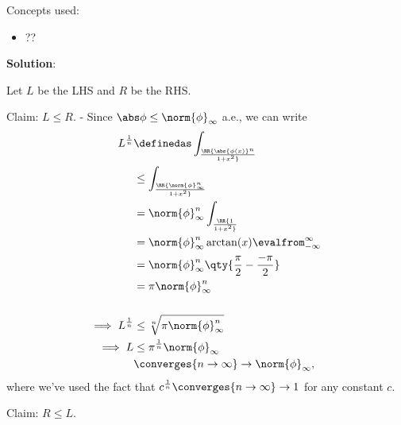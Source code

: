 \begin{solution}

Concepts used:

\begin{itemize}
\tightlist
\item
  ??
\end{itemize}

\textbf{Solution}:

Let \(L\) be the LHS and \(R\) be the RHS.

Claim: \(L\leq R\). - Since \(\abs \phi \leq \norm{\phi}_\infty\) a.e.,
we can write
\begin{align*}  
  L^{1\over n} 
  &\definedas \int_\RR { \abs{\phi(x)}^n \over 1+ x^2} \\
  &\leq \int_\RR { \norm{\phi}_\infty^n \over 1+ x^2}  \\
  &= \norm{\phi}_\infty^n \int_\RR {1\over 1 + x^2} \\
  &= \norm{\phi}_\infty^n \arctan(x)\evalfrom_{-\infty}^{\infty}  \\
  &= \norm{\phi}_\infty^n \qty{{\pi \over 2} - {-\pi \over 2} }  \\
  &= \pi \norm{\phi}_\infty^n \\ \\
  \implies L^{1\over n} &\leq \sqrt[n]{\pi \norm{\phi}_\infty^n} \\ 
  \implies L &\leq \pi^{1\over n} \norm{\phi}_\infty \\
  &\converges{n\to \infty }\to \norm{\phi}_\infty
  ,\end{align*} where we've used the fact that
\(c^{1\over n} \converges{n\to\infty}\to 1\) for any constant \(c\).

Claim: \(R\leq L\).


\end{solution}
